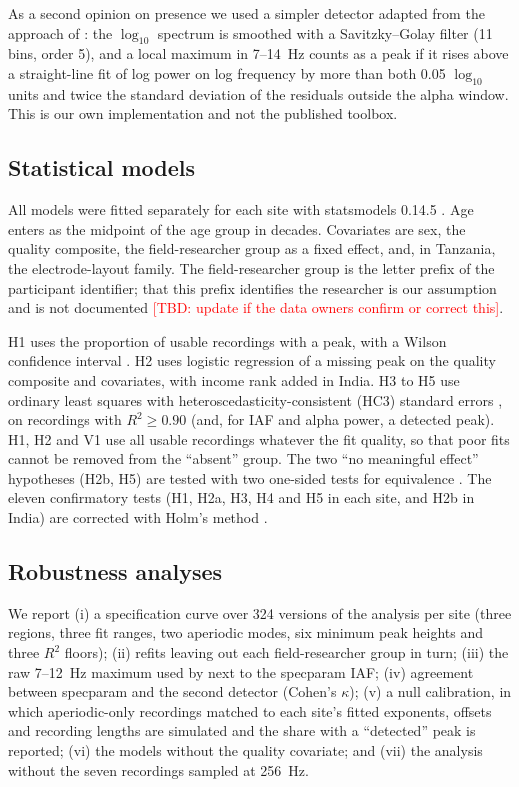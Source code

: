 \documentclass[11pt,a4paper]{article}
\newcommand{\TBD}[1]{\textcolor{red}{[TBD: #1]}}
\begin{document}
As a second opinion on presence we used a simpler detector adapted from the approach of
\citet{corcoran2018}: the $\log_{10}$ spectrum is smoothed with a Savitzky--Golay filter
\citep{savitzky1964} (11 bins, order 5), and a local maximum in 7--14~Hz counts as a peak if
it rises above a straight-line fit of log power on log frequency by more than both 0.05
$\log_{10}$ units and twice the standard deviation of the residuals outside the alpha
window. This is our own implementation and not the published toolbox.

\subsection{Statistical models}

All models were fitted separately for each site with statsmodels 0.14.5
\citep{seabold2010}. Age enters as the midpoint of the age group in decades. Covariates are
sex, the quality composite, the field-researcher group as a fixed effect, and, in
Tanzania, the electrode-layout family. The field-researcher group is the letter prefix of
the participant identifier; that this prefix identifies the researcher is our assumption
and is not documented \TBD{update if the data owners confirm or correct this}.

H1 uses the proportion of usable recordings with a peak, with a Wilson confidence interval
\citep{wilson1927}. H2 uses logistic regression of a missing peak on the quality composite
and covariates, with income rank added in India. H3 to H5 use ordinary least squares with
heteroscedasticity-consistent (HC3) standard errors \citep{long2000}, on recordings with
$R^2 \geq 0.90$ (and, for IAF and alpha power, a detected peak). H1, H2 and V1 use all
usable recordings whatever the fit quality, so that poor fits cannot be removed from the
``absent'' group. The two ``no meaningful effect'' hypotheses (H2b, H5) are tested with two
one-sided tests for equivalence \citep{lakens2017}. The eleven confirmatory tests (H1, H2a,
H3, H4 and H5 in each site, and H2b in India) are corrected with Holm's method
\citep{holm1979}.

\subsection{Robustness analyses}

We report (i) a specification curve \citep{simonsohn2020} over 324 versions of the analysis
per site (three regions, three fit ranges, two aperiodic modes, six minimum peak heights
and three $R^2$ floors); (ii) refits leaving out each field-researcher group in turn;
(iii) the raw 7--12~Hz maximum used by \citet{vianney2025} next to the specparam IAF;
(iv) agreement between specparam and the second detector (Cohen's $\kappa$); (v) a null
calibration, in which aperiodic-only recordings matched to each site's fitted exponents,
offsets and recording lengths are simulated and the share with a ``detected'' peak is
reported; (vi) the models without the quality covariate; and (vii) the analysis without
the seven recordings sampled at 256~Hz.
\end{document}
